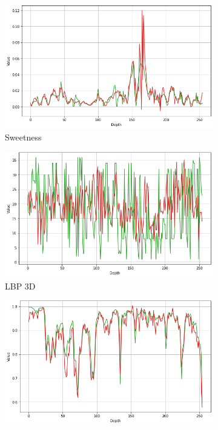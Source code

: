 \documentclass[conference]{IEEEtran}
\begin{document}
\begin{figure}[!t]
     \begin{subfigure}[b]{\figcompwidth\textwidth}
         \centering
        \includegraphics[width=1.0\columnwidth]{Fig/newFigs/sweetness-trace.png}
        \caption{Sweetness}
        \label{fig:swtrace}
     \end{subfigure}
     \begin{subfigure}[b]{\figcompwidth\textwidth}
         \centering
        \includegraphics[width=1.0\columnwidth]{Fig/newFigs/lbp3d-trace.png}
        \caption{LBP 3D}
        \label{fig:lbtrace}
     \end{subfigure}
    \begin{subfigure}[b]{\figcompwidth\textwidth}
         \centering
        \includegraphics[width=1.0\columnwidth]{Fig/newFigs/semblance-trace.png}

\end{subfigure}
\end{figure}
\end{document}
